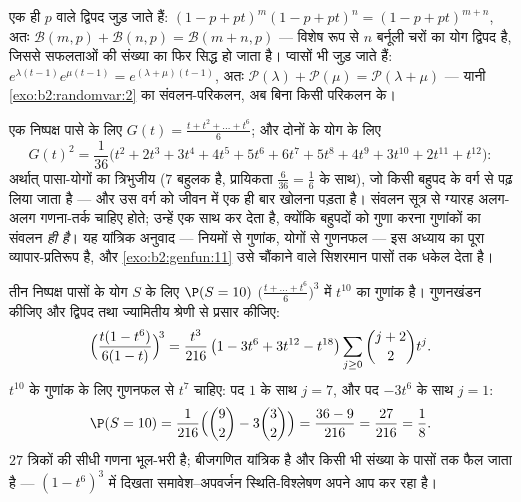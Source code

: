 \begin{example}[शास्त्रीय नियमों की स्थिरता]\label{ex:b2:genfun:stability}
एक ही $p$ वाले  द्विपद जुड़ जाते हैं: $(1 - p + pt)^m(1 -
p + pt)^n = (1 - p + pt)^{m+n}$, अतः $\mathcal{B}(m, p) +
\mathcal{B}(n, p) = \mathcal{B}(m + n, p)$ ---
विशेष रूप से $n$  बर्नूली चरों का योग द्विपद है, जिससे
सफलताओं की संख्या का  फिर सिद्ध हो जाता है।  प्वासों भी
जुड़ जाते हैं: $e^{\lambda(t-1)}e^{\mu(t-1)} = e^{(\lambda + \mu)(t-1)}$, अतः $\mathcal{P}(\lambda) + \mathcal{P}(\mu) = \mathcal{P}(\lambda +
\mu)$ --- यानी \cref{exo:b2:randomvar:2} का संवलन-परिकलन, अब बिना
किसी परिकलन के।
\end{example}

\begin{example}[दो पासे, एक बहुपद का
वर्ग]\label{ex:b2:genfun:twodice}
एक निष्पक्ष पासे के लिए $G(t) = \frac{t + t^2 + \dots + t^6}{6}$; और दोनों के योग के लिए
\[
G(t)^2 = \frac{1}{36}\bigl(t^2 + 2t^3 + 3t^4 + 4t^5 + 5t^6 +
6t^7 + 5t^8 + 4t^9 + 3t^{10} + 2t^{11} + t^{12}\bigr) :
\]
अर्थात् पासा-योगों का त्रिभुजीय  ($7$ बहुलक है, प्रायिकता $\frac6{36} = \frac16$
के साथ), जो किसी बहुपद के वर्ग से पढ़ लिया जाता है --- और उस वर्ग
को जीवन में एक ही बार खोलना पड़ता है। संवलन सूत्र से ग्यारह अलग-अलग
गणना-तर्क चाहिए होते;  उन्हें एक साथ कर देता है, क्योंकि
बहुपदों को गुणा करना गुणांकों का संवलन \emph{ही है}। यह यांत्रिक
अनुवाद --- नियमों से गुणांक, योगों से गुणनफल --- इस अध्याय का पूरा
व्यापार-प्रतिरूप है, और \cref{exo:b2:genfun:11} उसे चौंकाने वाले सिशरमान पासों तक
धकेल देता है।
\end{example}

\begin{example}[तीन पासे और एक गुणांक
निष्कर्षण]\label{ex:b2:genfun:threedice}
तीन निष्पक्ष पासों के योग $S$ के लिए $\P(S = 10)$ $\bigl(\frac{t + \dots +
t^6}6\bigr)^3$ में $t^{10}$ का गुणांक है।
गुणनखंडन कीजिए और द्विपद तथा ज्यामितीय श्रेणी से प्रसार कीजिए:
\[
\Bigl(\frac{t(1 - t^6)}{6(1 - t)}\Bigr)^{\!3}
= \frac{t^3}{216}\,\bigl(1 - 3t^6 + 3t^{12} -
t^{18}\bigr)\sum_{j\geq0}\binom{j+2}2t^j .
\]
$t^{10}$ के गुणांक के लिए गुणनफल से $t^7$ चाहिए: पद $1$ के साथ $j = 7$, और पद
$-3t^6$ के साथ $j = 1$:
\[
\P(S = 10) = \frac{1}{216}\Bigl(\binom92 -
3\binom32\Bigr) = \frac{36 - 9}{216} = \frac{27}{216} =
\frac18 .
\]
$27$ त्रिकों की सीधी गणना भूल-भरी है; बीजगणित यांत्रिक है और किसी
भी संख्या के पासों तक फैल जाता है --- $(1 - t^6)^3$ में दिखता
समावेश--अपवर्जन स्थिति-विश्लेषण अपने आप कर रहा है।
\end{example}

